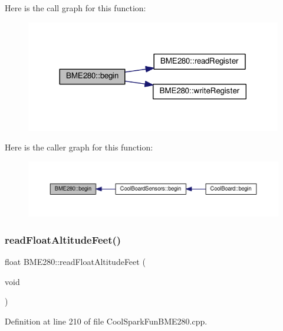 Here is the call graph for this function\+:
\nopagebreak
\begin{figure}[H]
\begin{center}
\leavevmode
\includegraphics[width=317pt]{class_b_m_e280_a994c102f010547f9c740a338ef9905c7_cgraph}
\end{center}
\end{figure}
Here is the caller graph for this function\+:
\nopagebreak
\begin{figure}[H]
\begin{center}
\leavevmode
\includegraphics[width=350pt]{class_b_m_e280_a994c102f010547f9c740a338ef9905c7_icgraph}
\end{center}
\end{figure}
\mbox{\label{class_b_m_e280_a6525c8a26f887b52596c86bed99343cb}} 
\subsubsection{\texorpdfstring{read\+Float\+Altitude\+Feet()}{readFloatAltitudeFeet()}}
{\footnotesize\ttfamily float B\+M\+E280\+::read\+Float\+Altitude\+Feet (\begin{DoxyParamCaption}\item[{void}]{ }\end{DoxyParamCaption})}



Definition at line 210 of file Cool\+Spark\+Fun\+B\+M\+E280.\+cpp.

